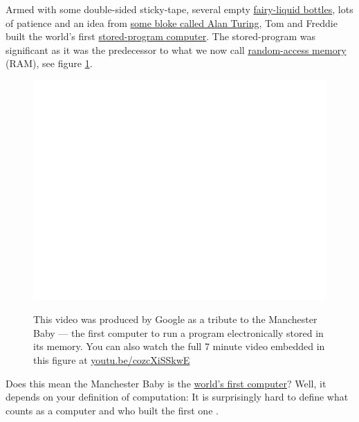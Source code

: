 \documentclass[
  12pt,
]{book}
\begin{document}
Armed with some double-sided sticky-tape, several empty \href{https://en.wikipedia.org/wiki/Fairy_(brand)}{fairy-liquid bottles}, lots of patience and an idea from \href{https://en.wikipedia.org/wiki/Alan_Turing}{some bloke called Alan Turing}, Tom and Freddie built the world's first \href{https://en.wikipedia.org/wiki/Stored-program_computer}{stored-program computer}. The stored-program was significant as it was the predecessor to what we now call \href{https://en.wikipedia.org/wiki/Random-access_memory}{random-access memory} (RAM), see figure \ref{fig:baby-fig}. \citep{longway-baby}

\begin{figure}

{\centering \href{https://www.youtube.com/embed/cozcXiSSkwE}{\includegraphics[width=0.99\linewidth]{duncan-hull_files/figure-latex/baby-fig-1} }

}

\caption{This video was produced by Google as a tribute to the Manchester Baby --- the first computer to run a program electronically stored in its memory. You can also watch the full 7 minute video embedded in this figure at \href{https://youtu.be/cozcXiSSkwE}{youtu.be/cozcXiSSkwE} \citep{youtube-baby}}\label{fig:baby-fig}
\end{figure}



Does this mean the Manchester Baby is the \href{https://www.computerhope.com/issues/ch000984.htm}{world's first computer}? Well, it depends on your definition of computation: It is surprisingly hard to define what counts as a computer and who built the first one \citep{firstcomputer}.
\end{document}
